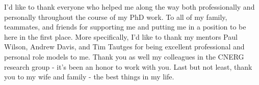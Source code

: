 



I'd like to thank everyone who helped me along the way both professionally and
personally throughout the course of my PhD work. To all of my family, teammates,
and friends for supporting me and putting me in a position to be here in the
first place. More specifically, I'd like to thank my mentors Paul Wilson, Andrew
Davis, and Tim Tautges for being excellent professional and personal role models
to me. Thank you as well my colleagues in the CNERG research group - it's been
an honor to work with you. Last but not least, thank you to my wife and family -
the best things in my life.

